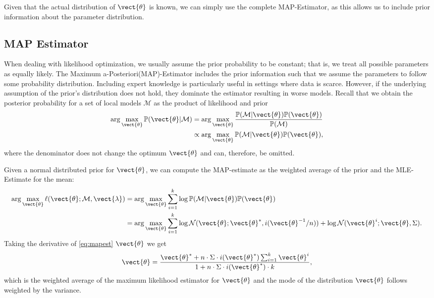 Given that the actual distribution of $\vect{\theta}$ is known, we can simply use the complete MAP-Estimator, as this allows us to include prior information about the parameter distribution.

\subsection{MAP Estimator}
When dealing with likelihood optimization, we usually assume the prior probability to be constant; that is, we treat all possible parameters as equally likely.
The Maximum a-Posteriori(MAP)-Estimator includes the prior information such that we assume the parameters to follow some probability distribution.
Including expert knowledge is particularly useful in settings where data is scarce.
However, if the underlying assumption of the prior's distribution does not hold, they dominate the estimator resulting in worse models.
Recall that we obtain the posterior probability for a set of local models $\mathcal{M}$ as the product of likelihood and prior
\begin{equation}
    \begin{split}
    \arg\max_{\vect{\theta}}\mathbb{P}(\vect{\theta} \lvert \mathcal{M} ) &= \arg\max_{\vect{\theta}} \frac{\mathbb{P}(\mathcal{M}\lvert \vect{\theta}) \mathbb{P}(\vect{\theta}) }{\mathbb{P}(\mathcal{M})} \\
    &\propto  \arg\max_{\vect{\theta}}\mathbb{P}(\mathcal{M}\lvert \vect{\theta}) \mathbb{P}(\vect{\theta})  ,
    \end{split}
\end{equation}
where the denominator does not change the optimum \wrt $\vect{\theta}$ and can, therefore, be omitted.

Given a normal distributed prior for $\vect{\theta}$, we can  compute the MAP-estimate as the weighted average of the prior and the MLE-Estimate for the mean:
\begin{equation}
    \label{eq:mapest}
    \begin{split}
    \arg\max_{\vect{\theta}} \ell(\vect{\theta}; \mathcal{M}, \vect{\lambda}) &= \arg\max_{\vect{\theta}} \sum_{i=1}^k \log \mathbb{P}(\mathcal{M}\lvert \vect{\theta}) \mathbb{P}(\vect{\theta}) \\
    &= \arg\max_{\vect{\theta}} \sum_{i=1}^k   \log \mathcal{N}(\vect{\theta}; \vect{\theta}^*, i(\vect{\theta}^{-1}/n))+  \log \mathcal{N}(\vect{\theta}^i ; \vect{\theta}, \Sigma).
    \end{split}
\end{equation}
Taking the derivative of \autoref{eq:mapest} \wrt $\vect{\theta}$ we get
\begin{equation}
    \vect{\theta} = \frac{\vect{\theta}^*  + n \cdot \Sigma \cdot i(\vect{\theta}^*) \sum_{i=1}^k \vect{\theta}^i}{1 + n \cdot \Sigma \cdot i(\vect{\theta}^*) \cdot k},
\end{equation}
which is the weighted average of the maximum likelihood estimator for $\vect{\theta}$ and the mode of the distribution $\vect{\theta}$ follows weighted by the variance.

